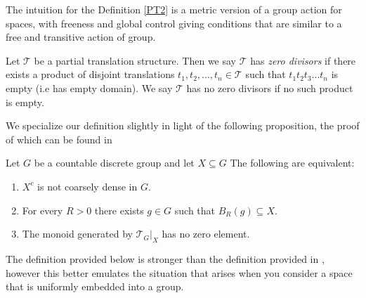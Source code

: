 \begin{corollary}
The intuition for the Definition \ref{PT2} is a metric version of a group action for spaces, with freeness and global control giving conditions that are similar to a free and transitive action of group. 

\begin{definition}\label{def:ZD1}
Let $\mathcal{T}$ be a partial translation structure. Then we say $\mathcal{T}$ has \textit{zero divisors} if there exists a product of disjoint translations $t_{1},t_{2},...,t_{n} \in \mathcal{T}$ such that $t_{1}t_{2}t_{3}...t_{n}$ is empty (i.e has empty domain). We say $\mathcal{T}$ has no zero divisors if no such product is empty.
\end{definition}
We specialize our definition slightly in light of the following proposition, the proof of which can be found in \cite[Proposition 8.1]{rosiesthesis}

\begin{proposition}\label{prop:TFAE} Let $G$ be a countable discrete group and let $X \subseteq G$
The following are equivalent:
\begin{enumerate}
\item $X^{c}$ is not coarsely dense in $G$.
\item For every $R>0$ there exists $g \in G$ such that $B_{R}(g) \subseteq X$.
\item The monoid generated by $\mathcal{T}_{G}|_{X}$ has no zero element.
\end{enumerate}
\end{proposition}
The definition provided below is stronger than the definition provided in \cite{MR2363428}, however this better emulates the situation that arises when you consider a space that is uniformly embedded into a group.



\end{corollary}
